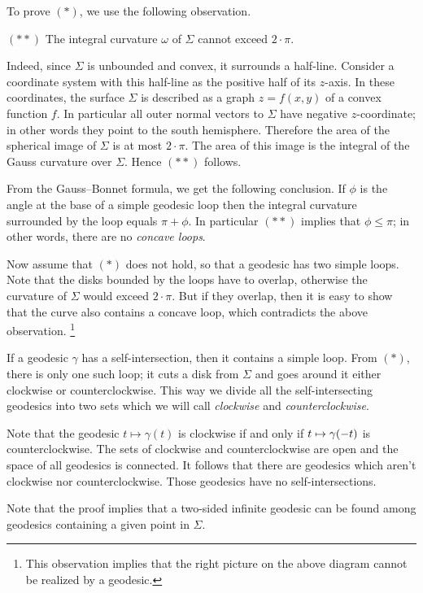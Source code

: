 To prove $({*})$, we use the following observation.

\begin{cl}{$({*}{*})$}
The integral curvature $\omega$ of $\Sigma$ cannot exceed $2\cdot\pi$.
\end{cl}

Indeed, since $\Sigma$ is unbounded and convex,
it surrounds a half-line.
Consider a coordinate system with this half-line as the positive half of its $z$-axis. 
In these coordinates, the surface $\Sigma$ is described as a graph $z=f(x,y)$ of a convex function $f$.
In particular all outer normal vectors to $\Sigma$ have negative $z$-coordinate;
in other words they point to the south hemisphere.
Therefore the area of the spherical image of $\Sigma$ is at most $2\cdot\pi$.
The area of this image is the integral of the Gauss curvature over $\Sigma$. 
Hence $({*}{*})$ follows.

From the Gauss--Bonnet formula, we get the following conclusion.
If $\phi$ is the angle at the base of a simple geodesic loop then the integral curvature surrounded by the loop equals $\pi+\phi$. 
In particular $({*}{*})$ implies that $\phi\le\pi$; in other words, there are no \emph{concave loops}.

Now assume that $({*})$ does not hold, so that a geodesic has two simple loops.
Note that the disks bounded by the loops  have to overlap,
otherwise the curvature of $\Sigma$ would exceed $2\cdot\pi$.
But if they overlap, then it is easy to show that the curve also contains a concave loop, 
which contradicts the above observation.%
\footnote{This observation implies that the right picture on the above diagram cannot be realized by a geodesic.}

If a geodesic $\gamma$ has a self-intersection,
then it contains a simple loop.
From $({*})$, there is only one such loop;
it cuts a disk from $\Sigma$ 
and goes around it either clockwise or counterclockwise.
This way we divide all the self-intersecting geodesics 
into two sets which we will call {}\emph{clockwise} and {}\emph{counterclockwise}.

Note that the geodesic $t\mapsto \gamma(t)$ is clockwise 
if and only if 
$t\z\mapsto \gamma(-t)$
is counterclockwise.
The sets of clockwise and counterclockwise are open and the space of all geodesics is connected. 
It follows that there are geodesics 
which aren't clockwise nor counterclockwise.
Those geodesics have no self-intersections.\qeds

Note that the proof implies that a two-sided infinite geodesic can be found among geodesics containing a given point in $\Sigma$.

